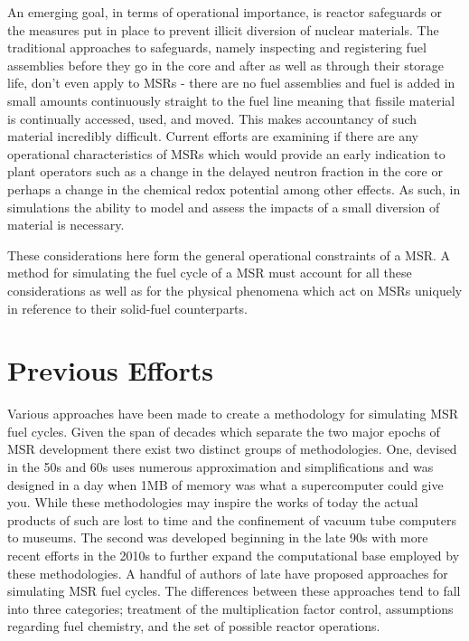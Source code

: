 An emerging goal, in terms of operational importance, is reactor safeguards or
the measures put in place to prevent illicit diversion of nuclear materials.
The traditional approaches to safeguards, namely inspecting and registering
fuel assemblies before they go in the core and after as well as through their
storage life, don't even apply to MSRs - there are no fuel assemblies and fuel
is added in small amounts continuously straight to the fuel line meaning that
fissile material is continually accessed, used, and moved. This makes
accountancy of such material incredibly difficult. Current efforts are examining
if there are any operational characteristics of MSRs which would provide an
early indication to plant operators such as a change in the delayed neutron
fraction in the core or perhaps a change in the chemical redox potential among
other effects. As such, in simulations the ability to model and assess the
impacts of a small diversion of material is necessary.

These considerations here form the general operational constraints of a MSR. A
method for simulating the fuel cycle of a MSR must account for all these
considerations as well as for the physical phenomena which act on MSRs
uniquely in reference to their solid-fuel counterparts.

\section{Previous Efforts}\label{ssec:efforts}

Various approaches have been made to create a methodology for simulating MSR
fuel cycles. Given the span of decades which separate the two major epochs of
MSR development there exist two distinct groups of methodologies. One, devised
in the 50s and 60s uses numerous approximation and simplifications and was
designed in a day when 1MB of memory was what a supercomputer could give you.
While these methodologies may inspire the works of today the actual products of
such are lost to time and the confinement of vacuum tube computers to museums.
The second was developed beginning in the late 90s with more recent efforts in
the 2010s to further expand the computational base employed by these
methodologies. A handful of authors of late have proposed approaches for
simulating MSR fuel cycles. The differences between these approaches tend to
fall into three categories; treatment of the multiplication factor control,
assumptions regarding fuel chemistry, and the set of possible reactor
operations.

